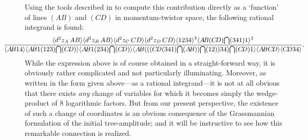 \documentclass[12pt,hyperref,compress]{JHEP3}
\newcommand{\eq}[1]{\begin{equation}#1\end{equation}}
\newcommand{\ab}[1]{\langle #1 \rangle}
\begin{document}
Using the tools described in \cite{ArkaniHamed:2010kv} to compute this contribution directly as a `function' of lines $(AB)$ and $(CD)$ in momentum-twistor space, the following rational integrand is found:
\vspace{-.2cm}\eq{\hspace{-2cm}\text{{\small$\displaystyle\frac{\ab{d^2z_{A}\,AB}\ab{d^2z_B\,AB}\ab{d^2z_C\,CD}\ab{d^2z_D\,CD}\ab{1234}^3\ab{A\!B(C\!D)\!\bigcap(341)1}^2}{\ab{A\!B 14}\ab{A\!B 1(123)\!\bigcap(C\!D)}\ab{A\!B1(234)\!\bigcap(C\!D)}\ab{A\!B(((C\!D(341)\!\bigcap(A\!B))\!\bigcap(12))34)\!\bigcap(C\!D)1}\ab{A\!B C\!D}\ab{C\!D 34}}$}}.\hspace{-2cm}\nonumber\vspace{-.2cm}}
While the expression above is of course obtained in a straight-forward way, it is obviously rather complicated and not particularly illuminating. Moreover, as written in the form given above---as a rational integrand---it is not at all obvious that there exists {\it any} change of variables for which it becomes simply the wedge-product of 8 logarithmic factors. But from our present perspective, the existence of such a change of coordinates is an obvious consequence of the Grassmannian formulation of the initial tree-amplitude; and it will be instructive to see how this remarkable connection is realized.
\end{document}
